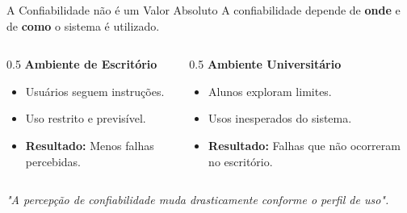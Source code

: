\documentclass[9pt]{beamer}
\begin{document}
\begin{frame}{A Confiabilidade não é um Valor Absoluto}
    A confiabilidade depende de \textbf{onde} e de \textbf{como} o sistema é utilizado.
    
    \begin{columns}[T]
        \begin{column}{0.5\textwidth}
            \textbf{Ambiente de Escritório}
            \begin{itemize}
                \item Usuários seguem instruções.
                \item Uso restrito e previsível.
                \item \textbf{Resultado:} Menos falhas percebidas.
            \end{itemize}
        \end{column}
        \begin{column}{0.5\textwidth}
            \textbf{Ambiente Universitário}
            \begin{itemize}
                \item Alunos exploram limites.
                \item Usos inesperados do sistema.
                \item \textbf{Resultado:} Falhas que não ocorreram no escritório.
            \end{itemize}
        \end{column}
    \end{columns}
    
    \vspace{0.4cm}
    \textit{"A percepção de confiabilidade muda drasticamente conforme o perfil de uso".}
\end{frame}
\end{document}
